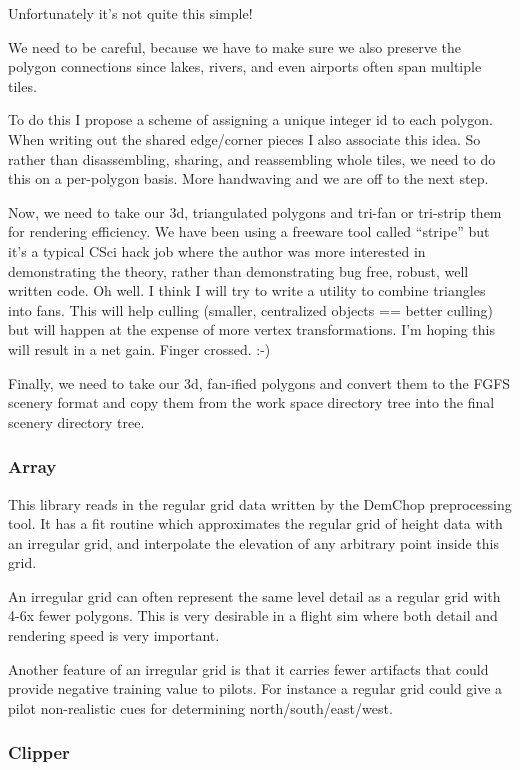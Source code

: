 \documentclass[12pt]{article}
\begin{document}
Unfortunately it's not quite this simple!

We need to be careful, because we have to make sure we also preserve
the polygon connections since lakes, rivers, and even airports often
span multiple tiles.

To do this I propose a scheme of assigning a unique integer id to each
polygon.  When writing out the shared edge/corner pieces I also
associate this idea.  So rather than disassembling, sharing, and
reassembling whole tiles, we need to do this on a per-polygon basis.
More handwaving and we are off to the next step.

Now, we need to take our 3d, triangulated polygons and tri-fan or
tri-strip them for rendering efficiency.  We have been using a
freeware tool called ``stripe'' but it's a typical CSci hack job where
the author was more interested in demonstrating the theory, rather
than demonstrating bug free, robust, well written code.  Oh well.  I
think I will try to write a utility to combine triangles into fans.
This will help culling (smaller, centralized objects == better
culling) but will happen at the expense of more vertex
transformations.  I'm hoping this will result in a net gain.  Finger
crossed. :-)

Finally, we need to take our 3d, fan-ified polygons and convert them
to the FGFS scenery format and copy them from the work space directory
tree into the final scenery directory tree.

\subsubsection{Array}

This library reads in the regular grid data written by the DemChop
preprocessing tool.  It has a fit routine which approximates the
regular grid of height data with an irregular grid, and interpolate
the elevation of any arbitrary point inside this grid.

An irregular grid can often represent the same level detail as a
regular grid with 4-6x fewer polygons.  This is very desirable in a
flight sim where both detail and rendering speed is very important.

Another feature of an irregular grid is that it carries fewer
artifacts that could provide negative training value to pilots.  For
instance a regular grid could give a pilot non-realistic cues for
determining north/south/east/west.

\subsubsection{Clipper}
\end{document}
